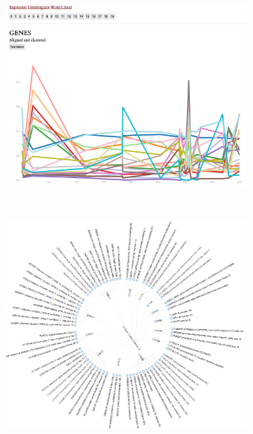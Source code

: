 \documentclass[aps,prd,final,onecolumn,a4paper,10pt]{revtex4}
\begin{document}
\begin{figure}[H]
  \centering
  \begin{subfigure}[b]{0.5\textwidth}
    \includegraphics[width=.9\textwidth]{graphs.png}
    \label{fig:dendrogram}
  \end{subfigure}%
  ~
  \begin{subfigure}[b]{0.5\textwidth}
    \includegraphics[width=.9\textwidth]{dendrogram.png}
    \label{fig:dendrogram}
  \end{subfigure}%


\end{figure}
\end{document}
